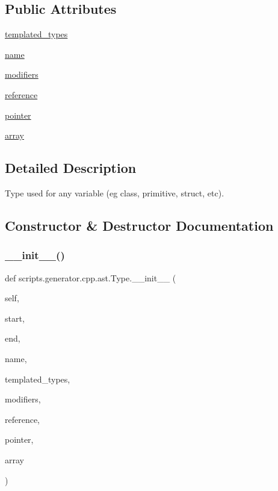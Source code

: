 \subsection*{Public Attributes}
\begin{DoxyCompactItemize}
\item 
\mbox{\hyperlink{classscripts_1_1generator_1_1cpp_1_1ast_1_1_type_a0c0032e5e17a59621b127c1c6ad27344}{templated\+\_\+types}}
\item 
\mbox{\hyperlink{classscripts_1_1generator_1_1cpp_1_1ast_1_1_type_a9ede10095acabc77f8275f50017a3339}{name}}
\item 
\mbox{\hyperlink{classscripts_1_1generator_1_1cpp_1_1ast_1_1_type_a35a629285097cce5929aa6122fecdb0d}{modifiers}}
\item 
\mbox{\hyperlink{classscripts_1_1generator_1_1cpp_1_1ast_1_1_type_a6785886dc7046eeaa1189c4df7d79e19}{reference}}
\item 
\mbox{\hyperlink{classscripts_1_1generator_1_1cpp_1_1ast_1_1_type_aa3952c9220bb6110cafa7b802012600b}{pointer}}
\item 
\mbox{\hyperlink{classscripts_1_1generator_1_1cpp_1_1ast_1_1_type_ad31b043de2eaa2d48039c3bb32f15605}{array}}
\end{DoxyCompactItemize}


\subsection{Detailed Description}
\begin{DoxyVerb}Type used for any variable (eg class, primitive, struct, etc).\end{DoxyVerb}
 

\subsection{Constructor \& Destructor Documentation}
\mbox{\label{classscripts_1_1generator_1_1cpp_1_1ast_1_1_type_a4b24fe1d4db182f8c8a7ba60f6bfbe47}} 
\subsubsection{\texorpdfstring{\_\_init\_\_()}{\_\_init\_\_()}}
{\footnotesize\ttfamily def scripts.\+generator.\+cpp.\+ast.\+Type.\+\_\+\+\_\+init\+\_\+\+\_\+ (\begin{DoxyParamCaption}\item[{}]{self,  }\item[{}]{start,  }\item[{}]{end,  }\item[{}]{name,  }\item[{}]{templated\+\_\+types,  }\item[{}]{modifiers,  }\item[{}]{reference,  }\item[{}]{pointer,  }\item[{}]{array }\end{DoxyParamCaption})}

